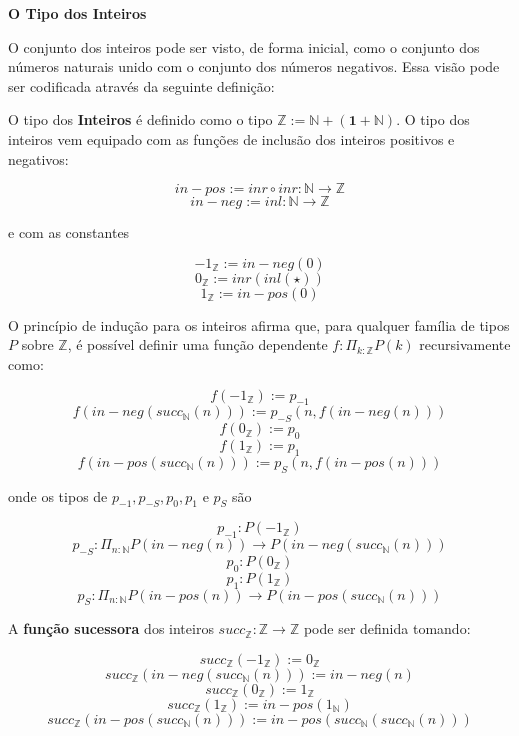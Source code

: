 \documentclass[../main.tex]{subfiles}
\begin{document}
\textbf{O Tipo dos Inteiros}

O conjunto dos inteiros pode ser visto, de forma inicial, como o conjunto dos números naturais unido com o conjunto dos números negativos. Essa visão pode ser codificada através da seguinte definição:

\begin{definition}
    O tipo dos \textbf{Inteiros} é definido como o tipo $\mathbb{Z} := \mathbb{N} + (\mathbf{1} + \mathbb{N})$. O tipo dos inteiros vem equipado com as funções de inclusão dos inteiros positivos e negativos:

    $$in-pos := inr \circ inr : \mathbb{N} \to \mathbb{Z}$$
    $$in-neg := inl : \mathbb{N} \to \mathbb{Z}$$

    e com as constantes

    $$-1_{\mathbb{Z}} := in-neg(0)$$
    $$0_{\mathbb{Z}} := inr(inl(\star))$$
    $$1_{\mathbb{Z}} := in-pos(0)$$
\end{definition}

O princípio de indução para os inteiros afirma que, para qualquer família de tipos $P$ sobre $\mathbb{Z}$, é possível definir uma função dependente $f : \Pi_{k : \mathbb{Z}} P(k)$ recursivamente como:

    $$f(-1_{\mathbb{Z}}) := p_{-1}$$
    $$f(in-neg(succ_{\mathbb{N}}(n))) := p_{-S}(n, f(in-neg(n)))$$
    $$f(0_{\mathbb{Z}}) := p_0$$
    $$f(1_{\mathbb{Z}}) := p_1$$
    $$f(in-pos(succ_{\mathbb{N}}(n))) := p_S(n, f(in-pos(n)))$$

onde os tipos de $p_{-1}, p_{-S}, p_0, p_1$ e $p_S$ são

$$p_{-1} : P(-1_{\mathbb{Z}})$$
$$p_{-S} : \Pi_{n : \mathbb{N}} P(in-neg(n)) \to P(in-neg (succ_{\mathbb{N}}(n)))$$
$$p_0 : P(0_{\mathbb{Z}})$$
$$p_1 : P(1_{\mathbb{Z}})$$
$$p_S : \Pi_{n : \mathbb{N}} P(in-pos(n)) \to P(in-pos(succ_{\mathbb{N}}(n)))$$

\begin{definition}
    A \textbf{função sucessora} dos inteiros $succ_{\mathbb{Z}} : \mathbb{Z} \to \mathbb{Z}$ pode ser definida tomando:

    $$succ_{\mathbb{Z}}(-1_{\mathbb{Z}}) := 0_{\mathbb{Z}}$$
    $$succ_{\mathbb{Z}}(in-neg(succ_{\mathbb{N}}(n))) := in-neg(n)$$
    $$succ_{\mathbb{Z}}(0_{\mathbb{Z}}) := 1_{\mathbb{Z}}$$
    $$succ_{\mathbb{Z}}(1_{\mathbb{Z}}) := in-pos(1_{\mathbb{N}})$$
    $$succ_{\mathbb{Z}}(in-pos(succ_{\mathbb{N}}(n))) := in-pos(succ_{\mathbb{N}}(succ_{\mathbb{N}}(n)))$$
\end{definition}
\end{document}
